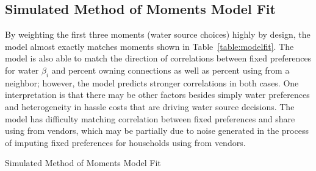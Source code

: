 \documentclass[12pt]{article}
\begin{document}
\begin{appendices}
\section{Simulated Method of Moments Model Fit}\label{appendix:modelfit}


By weighting the first three moments (water source choices) highly by design, the model almost exactly matches moments shown in Table~\ref{table:modelfit}.  The model is also able to match the direction of correlations between fixed preferences for water $\beta_i$ and percent owning connections as well as  percent using from a neighbor; however, the model predicts stronger correlations in both cases.  One interpretation is that there may be other factors besides simply water preferences and heterogeneity in hassle costs that are driving water source decisions.  The model has difficulty matching correlation between fixed preferences and share using from vendors, which may be partially due to noise generated in the process of imputing fixed preferences for households using from vendors.

\begin{table}
\centering
\caption{Simulated Method of Moments Model Fit}\label{table:modelfit}

\end{table}


\end{appendices}


{
\small
\nocite{*}


}



%  

%    



%
\end{document}
